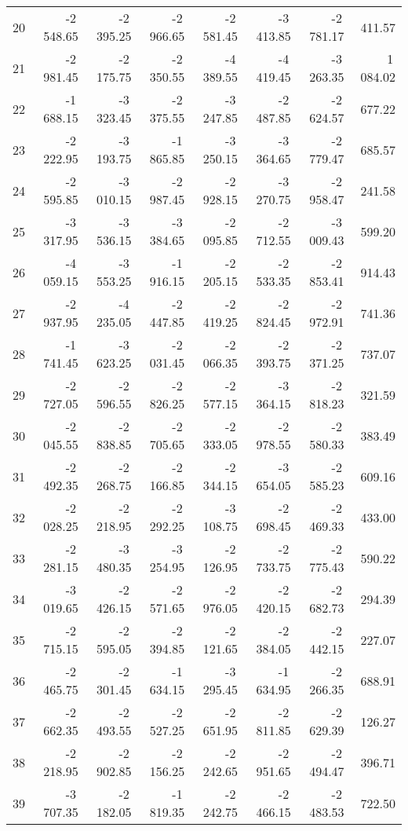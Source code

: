 \begin{longtable}{rrrrrrrr}
20 & -2\,548.65 & -2\,395.25 & -2\,966.65 & -2\,581.45 & -3\,413.85 & -2\,781.17 & 411.57  \\
21 & -2\,981.45 & -2\,175.75 & -2\,350.55 & -4\,389.55 & -4\,419.45 & -3\,263.35 & 1\,084.02  \\
22 & -1\,688.15 & -3\,323.45 & -2\,375.55 & -3\,247.85 & -2\,487.85 & -2\,624.57 & 677.22  \\
23 & -2\,222.95 & -3\,193.75 & -1\,865.85 & -3\,250.15 & -3\,364.65 & -2\,779.47 & 685.57  \\
24 & -2\,595.85 & -3\,010.15 & -2\,987.45 & -2\,928.15 & -3\,270.75 & -2\,958.47 & 241.58  \\
25 & -3\,317.95 & -3\,536.15 & -3\,384.65 & -2\,095.85 & -2\,712.55 & -3\,009.43 & 599.20  \\
26 & -4\,059.15 & -3\,553.25 & -1\,916.15 & -2\,205.15 & -2\,533.35 & -2\,853.41 & 914.43  \\
27 & -2\,937.95 & -4\,235.05 & -2\,447.85 & -2\,419.25 & -2\,824.45 & -2\,972.91 & 741.36  \\
28 & -1\,741.45 & -3\,623.25 & -2\,031.45 & -2\,066.35 & -2\,393.75 & -2\,371.25 & 737.07  \\
29 & -2\,727.05 & -2\,596.55 & -2\,826.25 & -2\,577.15 & -3\,364.15 & -2\,818.23 & 321.59  \\
30 & -2\,045.55 & -2\,838.85 & -2\,705.65 & -2\,333.05 & -2\,978.55 & -2\,580.33 & 383.49  \\
31 & -2\,492.35 & -2\,268.75 & -2\,166.85 & -2\,344.15 & -3\,654.05 & -2\,585.23 & 609.16  \\
32 & -2\,028.25 & -2\,218.95 & -2\,292.25 & -3\,108.75 & -2\,698.45 & -2\,469.33 & 433.00  \\
33 & -2\,281.15 & -3\,480.35 & -3\,254.95 & -2\,126.95 & -2\,733.75 & -2\,775.43 & 590.22  \\
34 & -3\,019.65 & -2\,426.15 & -2\,571.65 & -2\,976.05 & -2\,420.15 & -2\,682.73 & 294.39  \\
35 & -2\,715.15 & -2\,595.05 & -2\,394.85 & -2\,121.65 & -2\,384.05 & -2\,442.15 & 227.07  \\
36 & -2\,465.75 & -2\,301.45 & -1\,634.15 & -3\,295.45 & -1\,634.95 & -2\,266.35 & 688.91  \\
37 & -2\,662.35 & -2\,493.55 & -2\,527.25 & -2\,651.95 & -2\,811.85 & -2\,629.39 & 126.27  \\
38 & -2\,218.95 & -2\,902.85 & -2\,156.25 & -2\,242.65 & -2\,951.65 & -2\,494.47 & 396.71  \\
39 & -3\,707.35 & -2\,182.05 & -1\,819.35 & -2\,242.75 & -2\,466.15 & -2\,483.53 & 722.50  \\

\end{longtable}
